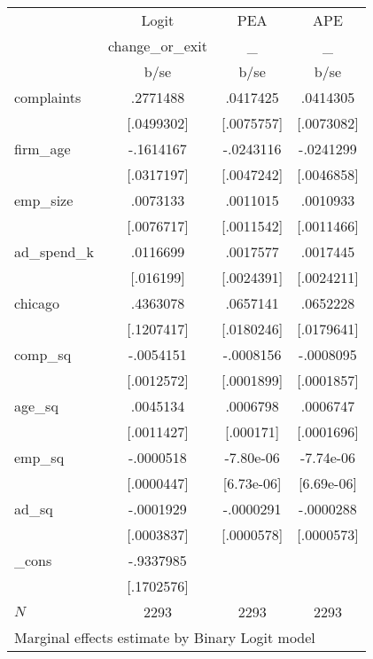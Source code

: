 \begin{tabular}{l*{3}{c}}
            &\multicolumn{1}{c}{Logit}&\multicolumn{1}{c}{PEA}&\multicolumn{1}{c}{APE}\\
            &change\_or\_exit&           \_&           \_\\
            &        b/se&        b/se&        b/se\\
complaints  &    .2771488&    .0417425&    .0414305\\
            &  [.0499302]&  [.0075757]&  [.0073082]\\
firm\_age    &   -.1614167&   -.0243116&   -.0241299\\
            &  [.0317197]&  [.0047242]&  [.0046858]\\
emp\_size    &    .0073133&    .0011015&    .0010933\\
            &  [.0076717]&  [.0011542]&  [.0011466]\\
ad\_spend\_k  &    .0116699&    .0017577&    .0017445\\
            &   [.016199]&  [.0024391]&  [.0024211]\\
chicago     &    .4363078&    .0657141&    .0652228\\
            &  [.1207417]&  [.0180246]&  [.0179641]\\
comp\_sq     &   -.0054151&   -.0008156&   -.0008095\\
            &  [.0012572]&  [.0001899]&  [.0001857]\\
age\_sq      &    .0045134&    .0006798&    .0006747\\
            &  [.0011427]&   [.000171]&  [.0001696]\\
emp\_sq      &   -.0000518&   -7.80e-06&   -7.74e-06\\
            &  [.0000447]&  [6.73e-06]&  [6.69e-06]\\
ad\_sq       &   -.0001929&   -.0000291&   -.0000288\\
            &  [.0003837]&  [.0000578]&  [.0000573]\\
\_cons      &   -.9337985&            &            \\
            &  [.1702576]&            &            \\
\(N\)       &        2293&        2293&        2293\\
\multicolumn{4}{l}{\footnotesize  Marginal effects estimate by Binary Logit model}\\
\end{tabular}
